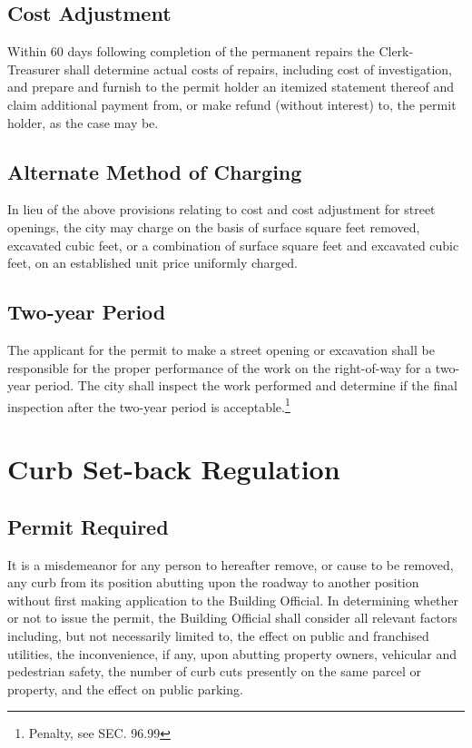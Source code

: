 \subsection{Cost Adjustment}
Within 60 days following completion of the permanent repairs the Clerk-Treasurer shall determine actual costs of repairs, including cost of investigation, and prepare and furnish to the permit holder an itemized statement thereof and claim additional payment from, or make refund (without interest) to, the permit holder, as the case may be.
\subsection{Alternate Method of Charging}
In lieu of the above provisions relating to cost and cost adjustment for street openings, the city may charge on the basis of surface square feet removed, excavated cubic feet, or a combination of surface square feet and excavated cubic feet, on an established unit price uniformly charged.
\subsection{Two-year Period}
The applicant for the permit to make a street opening or excavation shall be responsible for the proper performance of the work on the right-of-way for a two-year period.  The city shall inspect the work performed and determine if the final inspection after the two-year period is acceptable.\footnote{Penalty, see SEC. 96.99}

\section{Curb Set-back Regulation}
\subsection{Permit Required}
It is a misdemeanor for any person to hereafter remove, or cause to be removed, any curb from its position abutting upon the roadway to another position without first making application to the Building Official.  In determining whether or not to issue the permit, the Building Official shall consider all relevant factors including, but not necessarily limited to, the effect on public and franchised utilities, the inconvenience, if any, upon abutting property owners, vehicular and pedestrian safety, the number of curb cuts presently on the same parcel or property, and the effect on public parking.
